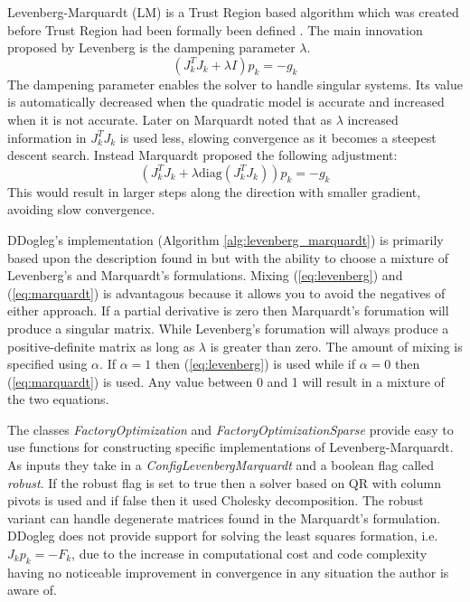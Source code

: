 \documentclass[peerreview,compsoc,onecolumn]{IEEEtran}
\begin{document}
Levenberg-Marquardt (LM) is a Trust Region based algorithm which was created before Trust Region had been formally been defined \cite{numopt2006,fletcher1987,dennis1996}. The main innovation proposed by Levenberg \cite{levenberg1944} is the dampening parameter $\lambda$.
\begin{equation}
\label{eq:levenberg}
(J_k^T J_k + \lambda I) p_k = -g_k
\end{equation} 
The dampening parameter enables the solver to handle singular systems. Its value is automatically decreased when the quadratic model is accurate and increased when it is not accurate. Later on Marquardt \cite{marquardt1963} noted that as $\lambda$ increased information in $J_k^T J_k$ is used less, slowing convergence as it becomes a steepest descent search. Instead Marquardt proposed the following adjustment:
\begin{equation}
\label{eq:marquardt}
(J_k^T J_k + \lambda \mbox{diag}(J_k^T J_k)) p_k = -g_k
\end{equation} 
This would result in larger steps along the direction with smaller gradient, avoiding slow convergence.

DDogleg's implementation (Algorithm \ref{alg:levenberg_marquardt}) is primarily based upon the description found in \cite{IMM2004} but with the ability to choose a mixture of Levenberg's and Marquardt's formulations. Mixing (\ref{eq:levenberg}) and (\ref{eq:marquardt}) is advantagous because it allows you to avoid the negatives of either approach. If a partial derivative is zero then Marquardt's forumation will produce a singular matrix. While Levenberg's forumation will always produce a positive-definite matrix as long as $\lambda$ is greater than zero. The amount of mixing is specified using $\alpha$. If $\alpha=1$ then (\ref{eq:levenberg}) is used while if $\alpha=0$ then (\ref{eq:marquardt}) is used. Any value between 0 and 1 will result in a mixture of the two equations.

The classes \emph{FactoryOptimization} and \emph{FactoryOptimizationSparse} provide easy to use functions for constructing specific implementations of Levenberg-Marquardt. As inputs they take in a \emph{ConfigLevenbergMarquardt} and a boolean flag called \emph{robust}. If the robust flag is set to true then a solver based on QR with column pivots is used and if false then it used Cholesky decomposition. The robust variant can handle degenerate matrices found in the Marquardt's formulation. DDogleg does not provide support for solving the least squares formation, i.e. $J_k p_k = -F_k$, due to the increase in computational cost and code complexity having no noticeable improvement in convergence in any situation the author is aware of.
\end{document}
